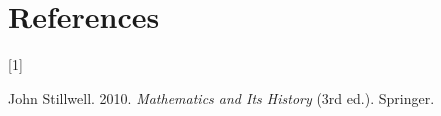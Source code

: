 \documentclass[
  a4paper,
]{article}
\newlength{\cslhangindent}
\newlength{\csllabelwidth}
\newenvironment{CSLReferences}[2] %
 {\begin{list}{}{%
  \setlength{\itemindent}{0pt}
  \setlength{\leftmargin}{0pt}
  \setlength{\parsep}{0pt}
  \ifodd #1
   \setlength{\leftmargin}{\cslhangindent}
   \setlength{\itemindent}{-1\cslhangindent}
  \fi
  \setlength{\itemsep}{#2\baselineskip}}}
 {\end{list}}
\newcommand{\CSLLeftMargin}[1]{\parbox[t]{\csllabelwidth}{\strut#1\strut}}
\newcommand{\CSLRightInline}[1]{\parbox[t]{\linewidth - \csllabelwidth}{\strut#1\strut}}
\begin{document}
\section*{References}\label{bibliography}

\label{refs}
\begin{CSLReferences}{0}{0}
\CSLLeftMargin{{[}1{]} }%
\CSLRightInline{John Stillwell. 2010. \emph{{Mathematics and Its
History}} (3rd ed.). Springer.}

\end{CSLReferences}
\end{document}
